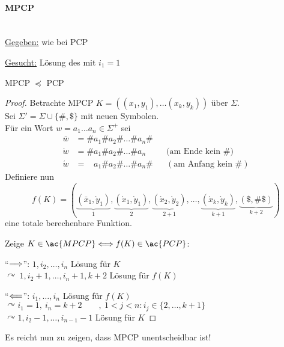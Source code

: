 \paragraph[\acf*{MPCP}]{\acf{MPCP}}\ \\
\underline{Gegeben:} wie bei \ac{PCP}

\underline{Gesucht:} Lösung des  mit $i_1=1$
\begin{lemma}[name={[MPCP $\preceq$ PCP]}]
    \ac{MPCP} $\preceq$ \ac{PCP}
\end{lemma}
\begin{proof}
	Betrachte \ac{MPCP} $K=((x_1,y_1),\dots(x_k,y_k))$ über $\Sigma$.\\
	Sei $\Sigma'=\Sigma\cup\{\#,\$\}$ mit neuen Symbolen.\\
	Für ein Wort $w=a_1\dots a_n\in\Sigma^+$ sei
	\begin{align*}
		\bar w &= \#a_1\#a_2\#\dots\#a_n\#\\
		\grave w &= \#a_1\#a_2\#\dots\#a_n &&\text{(am Ende kein \#)}\\
		\acute w &= \phantom{\#}a_1\#a_2\#\dots\#a_n\# &&(\text{am Anfang kein }\#)
	\end{align*}
	Definiere nun
	\[ f(K) = (\underbrace{(\bar x_1,\grave y_1)}_1, \underbrace{(\acute x_1, \grave y_1)}_2, \underbrace{(\acute x_2,\grave y_2)}_{2+1}, \dots, \underbrace{(\acute x_k,\grave y_k)}_{k+1}, \underbrace{(\$,\#\$)}_{k+2}) \]
	eine totale berechenbare Funktion.
	
	Zeige $K \in \ac{MPCP} \<==> f(K) \in \ac{PCP}$:
	
	"`$\==>$"': $1, i_2, \dots, i_n$ Lösung für $K$\\
	$\curvearrowright\ 1, i_{2}+1, \dots, i_{n}+1, k+2$ Lösung für $f(K)$
	
	"`$\<==$"': $i_1, \dots, i_n$ Lösung für $f(K)$\\
	$\curvearrowright i_1=1,\ i_n=k+2 \qquad,\ 1 < j < n: i_j \in \{2, \dots, k+1\}$\\
	$\curvearrowright 1, i_{2}-1, \dots, i_{n-1}-1$ Lösung für $K$
\end{proof}
Es reicht nun zu zeigen, dass \ac{MPCP} unentscheidbar ist!

